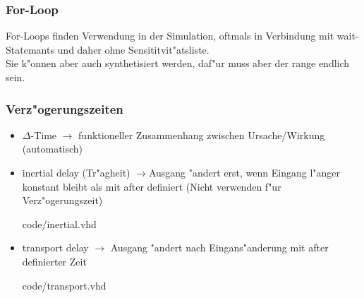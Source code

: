 		\begin{multicols}{2}
			\subsubsection{For-Loop} %
				For-Loops finden Verwendung in der Simulation, oftmals in Verbindung 
				mit wait-Statemants und daher ohne Sensititvit"atsliste.\\
				Sie k"onnen aber auch synthetisiert werden, daf"ur muss aber der range 
				endlich sein.
				
			\subsubsection{Verz"ogerungszeiten}  %
				\begin{itemize}
					\item $\Delta$-Time $\rightarrow$ funktioneller Zusammenhang 
						zwischen Ursache/Wirkung (automatisch)
					\item inertial delay (Tr"agheit) $\rightarrow$Ausgang "andert erst, 
						wenn Eingang l"anger konstant bleibt als mit after definiert 
						(Nicht verwenden f"ur Verz"ogerungszeit)
						
							{code/inertial.vhd}
					\item transport delay $\rightarrow$ Ausgang "andert nach 
						Eingans"anderung mit after definierter Zeit 
						
							{code/transport.vhd}
				\end{itemize}
		\end{multicols}

